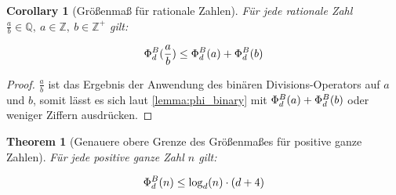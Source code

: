\documentclass{article}
\newtheorem{theorem}{Theorem}[section]
\newtheorem{corollary}{Corollary}[theorem]
\theoremstyle{nonumberplain}
\newtheorem{proof}{Beweis}
\begin{document}
\begin{corollary}[Größenmaß für rationale Zahlen]\label{corollary:phi_rational}
    Für jede rationale Zahl \(\frac{a}{b}\in\mathbb{Q},\ a\in\mathbb{Z},\ b\in\mathbb{Z}^+\) gilt:

    \[\Phi_{d}^{B}(\frac{a}{b}) \leq \Phi_{d}^{B}(a) + \Phi_{d}^{B}(b)\]
\end{corollary}
\begin{proof}
    \(\frac{a}{b}\) ist das Ergebnis der Anwendung des binären Divisions-Operators auf \(a\) und \(b\), somit lässt es sich laut \ref{lemma:phi_binary} mit \(\Phi_{d}^{B}(a) + \Phi_{d}^{B}(b)\) oder weniger Ziffern ausdrücken.
\end{proof}
\begin{theorem}[Genauere obere Grenze des Größenmaßes für positive ganze Zahlen]\label{theorem:accurate_bound}
    Für jede positive ganze Zahl \(n\) gilt:
    
        \[\Phi_{d}^{B}(n) \leq \log_d(n) \cdot (d+4)\]
\end{theorem}
\end{document}
